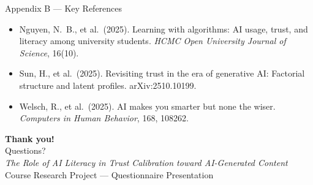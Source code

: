 \documentclass[10pt,aspectratio=169]{beamer}
\begin{document}
\begin{frame}{Appendix B --- Key References}
\begin{itemize}
    \item Nguyen, N.\ B., et al.\ (2025). Learning with algorithms: AI usage, trust, and literacy
          among university students. \textit{HCMC Open University Journal of Science}, 16(10).

    \item Sun, H., et al.\ (2025). Revisiting trust in the era of generative AI: Factorial structure
          and latent profiles. arXiv:2510.10199.

    \item Welsch, R., et al.\ (2025). AI makes you smarter but none the wiser.
          \textit{Computers in Human Behavior}, 168, 108262.
  \end{itemize}
\end{frame}

\begin{frame}[plain]
  \vfill
  \centering
  {\Huge\bfseries Thank you!}\\[1em]
  {\Large Questions?}\\[2em]
  \footnotesize
  \textit{The Role of AI Literacy in Trust Calibration toward AI-Generated Content}\\
  Course Research Project --- Questionnaire Presentation
  \vfill
\end{frame}
\end{document}
